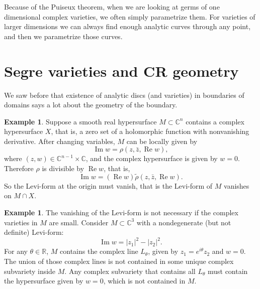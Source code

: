 \documentclass[12pt,openany]{book}
\renewcommand{\Re}{\operatorname{Re}}
\renewcommand{\Im}{\operatorname{Im}}
\newcommand{\abs}[1]{\left\lvert {#1} \right\rvert}
\newcommand{\C}{{\mathbb{C}}}
\newcommand{\R}{{\mathbb{R}}}
\newcommand{\sectionnewpage}{}
\theoremstyle{plain}
\theoremstyle{remark}
\theoremstyle{definition}
\theoremstyle{exercise}
\theoremstyle{example}
\newtheorem{example}[thm]{Example}
\begin{document}
Because of the Puiseux theorem, when we are looking at germs of
one dimensional complex
varieties, we often simply parametrize them.  For 
varieties of larger
dimensions we can always find enough analytic curves through any point,
and then we parametrize those curves.


\sectionnewpage
\section{Segre varieties and CR geometry} \label{sec:crgeomcr}

We saw before that existence of analytic discs (and varieties)
in boundaries of domains says a lot about the geometry of the boundary.

\begin{example}
Suppose a smooth real hypersurface $M \subset \C^n$ contains a complex hypersurface $X$, that is,
a zero set of a holomorphic function with nonvanishing derivative.  After
changing variables, $M$ can be locally given by
\begin{equation*}
\Im w = \rho(z,\bar{z},\Re w) ,
\end{equation*}
where $(z,w) \in \C^{n-1} \times \C$, and the 
complex hypersurface is given by $w = 0$.  Therefore $\rho$
is divisible by $\Re w$, that is,
\begin{equation*}
\Im w = (\Re w) \widetilde{\rho}(z,\bar{z},\Re w)  .
\end{equation*}
So the Levi-form at the origin must vanish,
that is the Levi-form of $M$ vanishes on $M \cap X$.
\end{example}

\begin{example}
The vanishing of the Levi-form is not necessary if the complex varieties in
$M$ are small.  Consider $M\subset \C^3$ with a nondegenerate (but not definite)
Levi-form:
\begin{equation*}
\Im w = \abs{z_1}^2-\abs{z_2}^2 .
\end{equation*}
For any $\theta \in \R$,
$M$ contains the complex line $L_\theta$,
given by $z_1 = e^{i\theta} z_2$ and
$w = 0$.  The union of those complex lines is not
contained in some unique complex subvariety inside $M$.  Any complex
subvariety that contains all $L_\theta$ must contain the hypersurface given
by $w = 0$, which is not contained in $M$.
\end{example}
\end{document}
